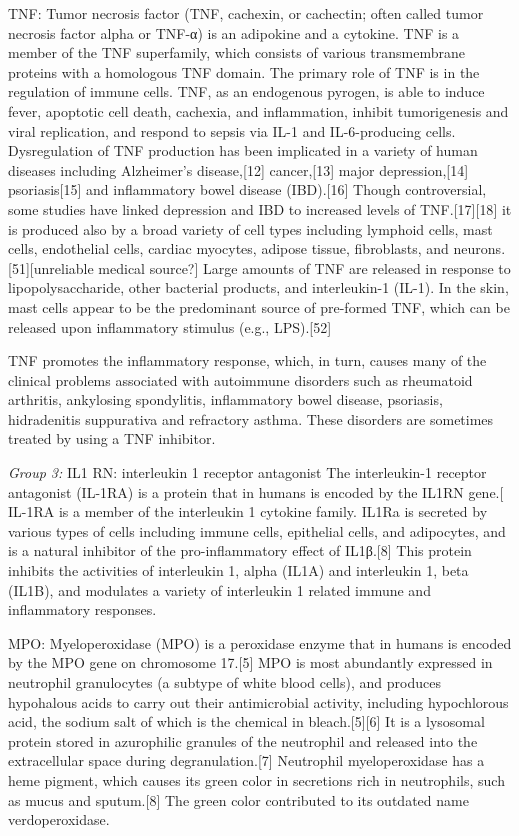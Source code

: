 \documentclass[
]{article}
\begin{document}
TNF: Tumor necrosis factor (TNF, cachexin, or cachectin; often called
tumor necrosis factor alpha or TNF-α) is an adipokine and a cytokine.
TNF is a member of the TNF superfamily, which consists of various
transmembrane proteins with a homologous TNF domain. The primary role of
TNF is in the regulation of immune cells. TNF, as an endogenous pyrogen,
is able to induce fever, apoptotic cell death, cachexia, and
inflammation, inhibit tumorigenesis and viral replication, and respond
to sepsis via IL-1 and IL-6-producing cells. Dysregulation of TNF
production has been implicated in a variety of human diseases including
Alzheimer's disease,{[}12{]} cancer,{[}13{]} major depression,{[}14{]}
psoriasis{[}15{]} and inflammatory bowel disease (IBD).{[}16{]} Though
controversial, some studies have linked depression and IBD to increased
levels of TNF.{[}17{]}{[}18{]} it is produced also by a broad variety of
cell types including lymphoid cells, mast cells, endothelial cells,
cardiac myocytes, adipose tissue, fibroblasts, and
neurons.{[}51{]}{[}unreliable medical source?{]} Large amounts of TNF
are released in response to lipopolysaccharide, other bacterial
products, and interleukin-1 (IL-1). In the skin, mast cells appear to be
the predominant source of pre-formed TNF, which can be released upon
inflammatory stimulus (e.g., LPS).{[}52{]}

TNF promotes the inflammatory response, which, in turn, causes many of
the clinical problems associated with autoimmune disorders such as
rheumatoid arthritis, ankylosing spondylitis, inflammatory bowel
disease, psoriasis, hidradenitis suppurativa and refractory asthma.
These disorders are sometimes treated by using a TNF inhibitor.

\emph{Group 3:} IL1 RN: interleukin 1 receptor antagonist The
interleukin-1 receptor antagonist (IL-1RA) is a protein that in humans
is encoded by the IL1RN gene.{[} IL-1RA is a member of the interleukin 1
cytokine family. IL1Ra is secreted by various types of cells including
immune cells, epithelial cells, and adipocytes, and is a natural
inhibitor of the pro-inflammatory effect of IL1β.{[}8{]} This protein
inhibits the activities of interleukin 1, alpha (IL1A) and interleukin
1, beta (IL1B), and modulates a variety of interleukin 1 related immune
and inflammatory responses.

MPO: Myeloperoxidase (MPO) is a peroxidase enzyme that in humans is
encoded by the MPO gene on chromosome 17.{[}5{]} MPO is most abundantly
expressed in neutrophil granulocytes (a subtype of white blood cells),
and produces hypohalous acids to carry out their antimicrobial activity,
including hypochlorous acid, the sodium salt of which is the chemical in
bleach.{[}5{]}{[}6{]} It is a lysosomal protein stored in azurophilic
granules of the neutrophil and released into the extracellular space
during degranulation.{[}7{]} Neutrophil myeloperoxidase has a heme
pigment, which causes its green color in secretions rich in neutrophils,
such as mucus and sputum.{[}8{]} The green color contributed to its
outdated name verdoperoxidase.
\end{document}
